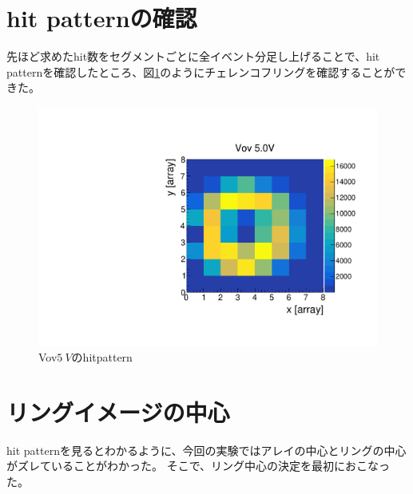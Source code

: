 \documentclass[uplatex, titlepage, dvipdfmx, 12pt, a4paper]{jsreport}
\begin{document}
  \section{hit patternの確認}
    先ほど求めたhit数をセグメントごとに全イベント分足し上げることで、hit patternを確認したところ、図\ref{fig:hitpattern}のようにチェレンコフリングを確認することができた。
    \begin{figure}[h]
      \begin{center} 
        \includegraphics[scale=0.5, clip]{image/hitpattern.pdf}
        \caption{Vov$\SI{5}{V}$のhitpattern} 
        \label{fig:hitpattern} 
      \end{center}
    \end{figure}

  \section{リングイメージの中心}
    hit patternを見るとわかるように、今回の実験ではアレイの中心とリングの中心がズレていることがわかった。
    そこで、リング中心の決定を最初におこなった。
\end{document}
